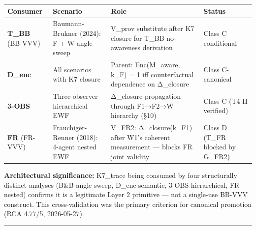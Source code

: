 \documentclass[
  11pt,
]{article}
\newcounter{none} %
\begin{document}
{\def\LTcaptype{none} %
\begin{longtable}[]{@{}
  >{\raggedright\arraybackslash}p{}
  >{\raggedright\arraybackslash}p{}
  >{\raggedright\arraybackslash}p{}
  >{\raggedright\arraybackslash}p{}@{}}
\toprule\noalign{}
\begin{minipage}[b]{\linewidth}\raggedright
Consumer
\end{minipage} & \begin{minipage}[b]{\linewidth}\raggedright
Scenario
\end{minipage} & \begin{minipage}[b]{\linewidth}\raggedright
Role
\end{minipage} & \begin{minipage}[b]{\linewidth}\raggedright
Status
\end{minipage} \\
\midrule\noalign{}
\endhead
\bottomrule\noalign{}
\endlastfoot
\textbf{T\_BB} (BB-VVV) & Baumann-Brukner (2024): F + W angle sweep &
V\_prov substitute after K7 closure for T\_BB no-awareness derivation &
Class C conditional \\
\textbf{D\_enc} & All scenarios with K7 closure & Parent: Enc(M\_aware,
k\_F) = 1 iff counterfactual dependence on Δ\_closure & Class
C-canonical \\
\textbf{3-OBS} & Three-observer hierarchical EWF & Δ\_closure
propagation through F1→F2→W hierarchy (§10) & Class C (T4-H verified) \\
\textbf{FR} (FR-VVV) & Frauchiger-Renner (2018): 4-agent nested EWF &
V\_FR2: Δ\_closure(k\_F1) after W1's coherent measurement --- blocks FR
joint validity & Class D (T\_FR blocked by G\_FR2) \\
\end{longtable}
}

\textbf{Architectural significance:} K7\_trace being consumed by four
structurally distinct analyses (B\&B angle-sweep, D\_enc semantic, 3-OBS
hierarchical, FR nested) confirms it is a legitimate Layer 2 primitive
--- not a single-use BB-VVV construct. This cross-validation was the
primary criterion for canonical promotion (RCA 4.77/5, 2026-05-27).

\begin{center}\rule{0.5\linewidth}{0.5pt}\end{center}
\end{document}
